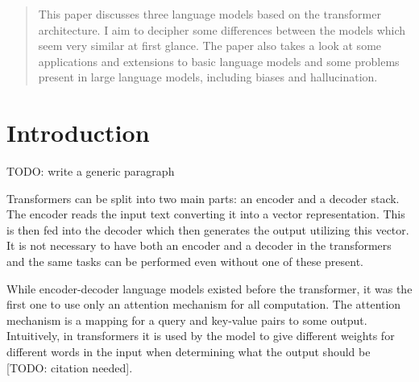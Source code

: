 \documentclass[twoside]{article}
\begin{document}
%

%


\begin{abstract}
  This paper discusses three language models based on the transformer architecture.
  I aim to decipher some differences between the models which seem very similar at first glance.
  The paper also takes a look at some applications and extensions to basic language
  models and some problems present in large language models, including biases
  and hallucination.
\end{abstract}

\section{Introduction}

TODO: write a generic paragraph

Transformers can be split into two main parts: an encoder and a decoder stack. 
The encoder reads the input text converting it into a vector representation. This is
then fed into the decoder which then generates the output utilizing this vector.
It is not necessary to have both an encoder and a decoder in the transformers
and the same tasks can be performed even without one of these present.

While encoder-decoder language models existed before the transformer, it was 
the first one to use only an attention mechanism for all computation. 
The attention mechanism is a mapping for a query and key-value pairs to some output. 
Intuitively, in transformers
it is used by the model to give different weights for different words in the input when
determining what the output should be [TODO: citation needed].
\end{document}
